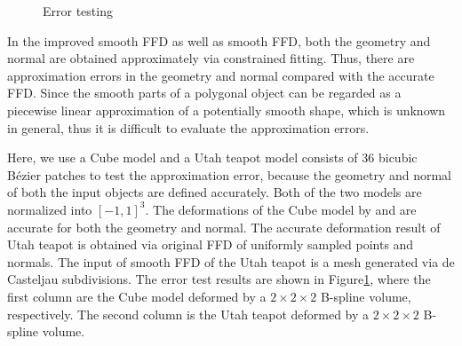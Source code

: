 \documentclass[3p]{elsarticle}
\begin{document}
\begin{figure}
    \ContinuedFloat
	\par
	\caption{Error testing}
	\label{fig:error}
\end{figure}

In the improved smooth FFD as well as smooth FFD, both the geometry and normal are obtained approximately via constrained fitting. Thus, there
are approximation errors in the geometry and normal compared with the accurate FFD. Since the smooth parts of a
polygonal object can be regarded as a piecewise linear approximation of a potentially smooth shape, which is unknown in
general, thus it is difficult to evaluate the approximation errors.

Here, we use a Cube model and a Utah teapot model consists of 36 bicubic B\'ezier patches to test the approximation
error, because the geometry and normal of both the input objects are defined accurately. Both of the two models are
normalized into $[-1,1]^3$. The deformations of the Cube model by \cite{Cui13} and \cite{Cui14} are accurate for both
the geometry and normal. The accurate deformation result of Utah teapot is obtained via original FFD of uniformly
sampled points and normals. The input of smooth FFD of the Utah teapot is a mesh generated via de Casteljau
subdivisions. The error test results are shown in Figure\ref{fig:error}, where the first column are the
Cube model deformed by a $2\times2\times2$ B-spline volume, respectively. The second column is the
Utah teapot deformed by a $2\times2\times2$ B-spline volume.
\end{document}
